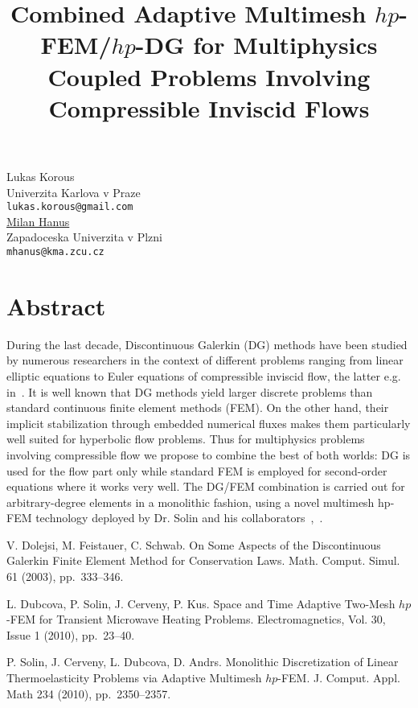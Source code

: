 

\title{Combined Adaptive Multimesh $hp$-FEM/$hp$-DG for Multiphysics 
Coupled Problems Involving Compressible Inviscid Flows}
\author{} \institute{} %
\maketitle
\begin{center}
{\large Lukas Korous}\\
Univerzita Karlova v Praze\\
{\tt lukas.korous@gmail.com}\\
\vspace{4mm} %
{\large \underline{Milan Hanus}}\\
Zapadoceska Univerzita v Plzni\\
{\tt mhanus@kma.zcu.cz}
\end{center}

\section*{Abstract}

During the last decade, Discontinuous Galerkin (DG) methods have
been studied by numerous researchers in the context of different
problems ranging from linear elliptic equations to Euler equations
of compressible inviscid flow, the latter e.g. in~\cite{1}. It is well known that DG methods
yield larger discrete problems than standard continuous finite
element methods (FEM). On the other hand, their implicit stabilization
through embedded numerical fluxes makes them particularly well
suited for hyperbolic flow problems. Thus for multiphysics problems
involving compressible flow we propose to combine the best
of both worlds: DG is used for the flow part only while standard
FEM is employed for second-order equations where it works very well.
The DG/FEM combination is carried out for arbitrary-degree elements
in a monolithic fashion, using a novel multimesh hp-FEM technology
deployed by Dr. Solin and his collaborators~\cite{2},~\cite{3}.



\begin{thebibliography}{10}

{\sc V. Dolejsi, M. Feistauer, C. Schwab}. {On Some Aspects of the Discontinuous Galerkin Finite Element Method for Conservation Laws}. Math. Comput. Simul. 61 (2003), pp.~333--346.

{\sc L. Dubcova, P. Solin, J. Cerveny, P. Kus}. {Space and Time Adaptive Two-Mesh $hp$-FEM for Transient Microwave Heating Problems}. Electromagnetics, Vol. 30, Issue 1 (2010), pp.~23--40.

{\sc P. Solin, J. Cerveny, L. Dubcova, D. Andrs}. {Monolithic Discretization of Linear Thermoelasticity Problems via Adaptive Multimesh $hp$-FEM}. J. Comput. Appl. Math 234 (2010), pp.~2350--2357.

\end{thebibliography}

